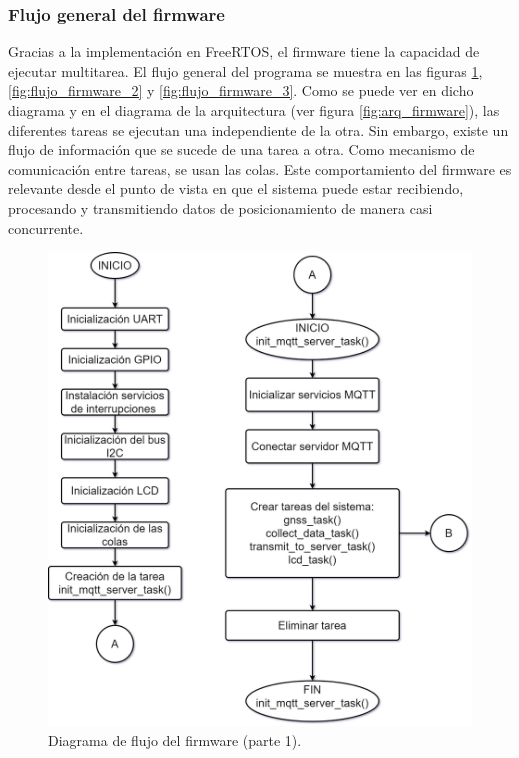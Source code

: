 \subsubsection{Flujo general del firmware}

Gracias a la implementación en FreeRTOS, el firmware tiene la capacidad de ejecutar multitarea. El flujo general del programa se muestra en las figuras \ref{fig:flujo_firmware_1}, \ref{fig:flujo_firmware_2} y \ref{fig:flujo_firmware_3}. Como se puede ver en dicho diagrama y en el diagrama de la arquitectura (ver figura \ref{fig:arq_firmware}), las diferentes tareas se ejecutan una independiente de la otra. Sin embargo, existe un flujo de información que se sucede de una tarea a otra. Como mecanismo de comunicación entre tareas, se usan las colas. Este comportamiento del firmware es relevante desde el punto de vista en que el sistema puede estar recibiendo, procesando y transmitiendo datos de posicionamiento de manera casi concurrente. 

\begin{figure}
	\centering
	\includegraphics[width=.8\textwidth]{./Figures/Diagrama_flujo_firmware_TFE_CESE_Part_1.png}
	\caption{Diagrama de flujo del firmware (parte 1).}
	\label{fig:flujo_firmware_1}
\end{figure}

